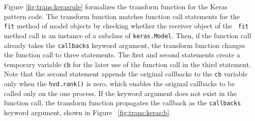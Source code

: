 Figure \ref{fig:trans:kerasrule} formalizes the transform function for the
Keras pattern code.
The transform function matches function call statements for the {\tt fit}
method of model objects by checking whether the receiver object of the {\tt
fit} method call is an instance of a subclass of {\tt keras.Model}.
Then, if the function call already takes the {\tt callbacks} keyword argument,
the transform function changes the function call to three statements. 
The first and second statements create a temporary variable {\tt cb} for the
later use of the function call in the third statement.
Note that the second statement appends the original callbacks to the {\tt cb}
variable only when the {\tt hvd.rank()} is zero, which enables the original
callbacks to be called only on the one process.
If the keyword argument does not exist in the function call, the transform
function propagates the callback as the {\tt callbacks} keyword argument, shown
in Figure~ \ref{fig:trans:keras:b}.

